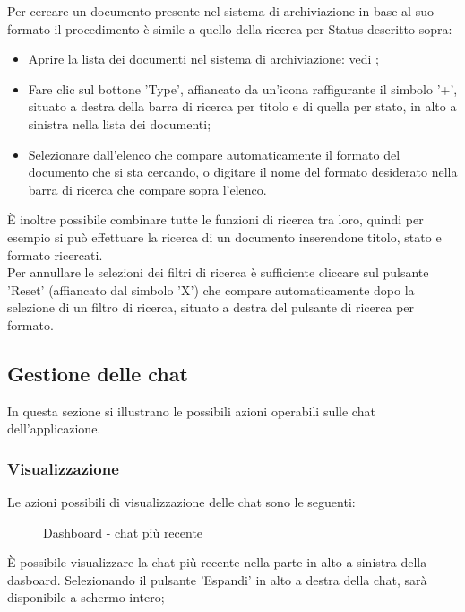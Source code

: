 \documentclass[10pt, a4paper]{article}
\begin{document}
Per cercare un documento presente nel sistema di archiviazione in base al suo formato il procedimento è simile a quello della ricerca per Status descritto sopra:
\begin{itemize}
    \item Aprire la lista dei documenti nel sistema di archiviazione: vedi ;
    \item Fare clic sul bottone 'Type', affiancato da un'icona raffigurante il simbolo '+', situato a destra della barra di ricerca per titolo e di quella per stato, in alto a sinistra nella lista dei documenti;
    \item Selezionare dall'elenco che compare automaticamente il formato del documento che si sta cercando, o digitare il nome del formato desiderato nella barra di ricerca che compare sopra l'elenco.
\end{itemize}
È inoltre possibile combinare tutte le funzioni di ricerca tra loro, quindi per esempio si può effettuare la ricerca di un documento inserendone titolo, stato e formato ricercati. \\ Per annullare le selezioni dei filtri di ricerca è sufficiente cliccare sul pulsante 'Reset' (affiancato dal simbolo 'X') che compare automaticamente dopo la selezione di un filtro di ricerca, situato a destra del pulsante di ricerca per formato.

\newpage
\subsection{Gestione delle chat}
In questa sezione si illustrano le possibili azioni operabili sulle chat dell'applicazione. 
\subsubsection{Visualizzazione}
Le azioni possibili di visualizzazione delle chat sono le seguenti:
    \begin{figure}[H]
        \centering  
        \caption{Dashboard - chat più recente}
        \label{img:dashrecentchat}
    \end{figure}
    È possibile visualizzare la chat più recente nella parte in alto a sinistra della dasboard. Selezionando il pulsante 'Espandi' in alto a destra della chat, sarà disponibile a schermo intero;
\end{document}
